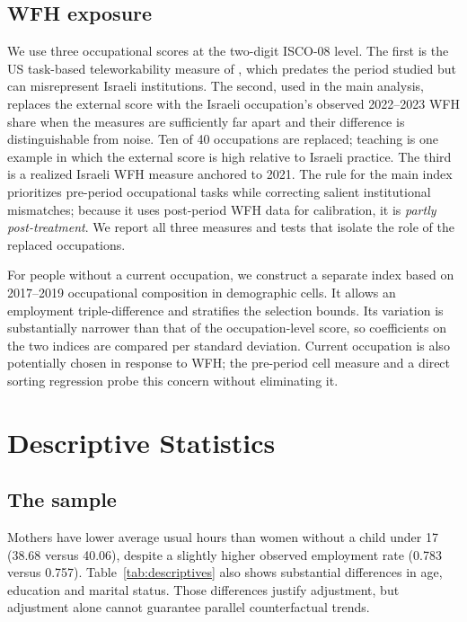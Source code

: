 \documentclass[12pt,a4paper]{article}
\begin{document}
\subsection{WFH exposure}\label{sec:exposure}
We use three occupational scores at the two-digit ISCO-08 level. The first is the US task-based teleworkability measure of \citet{dingel2020}, which predates the period studied but can misrepresent Israeli institutions. The second, used in the main analysis, replaces the external score with the Israeli occupation's observed 2022--2023 WFH share when the measures are sufficiently far apart and their difference is distinguishable from noise. Ten of 40 occupations are replaced; teaching is one example in which the external score is high relative to Israeli practice. The third is a realized Israeli WFH measure anchored to 2021. The rule for the main index prioritizes pre-period occupational tasks while correcting salient institutional mismatches; because it uses post-period WFH data for calibration, it is \emph{partly post-treatment}. We report all three measures and tests that isolate the role of the replaced occupations.

For people without a current occupation, we construct a separate index based on 2017--2019 occupational composition in demographic cells. It allows an employment triple-difference and stratifies the selection bounds. Its variation is substantially narrower than that of the occupation-level score, so coefficients on the two indices are compared per standard deviation. Current occupation is also potentially chosen in response to WFH; the pre-period cell measure and a direct sorting regression probe this concern without eliminating it.

\section{Descriptive Statistics}\label{sec:descriptives}
\subsection{The sample}
Mothers have lower average usual hours than women without a child under 17 (38.68 versus 40.06), despite a slightly higher observed employment rate (0.783 versus 0.757). Table~\ref{tab:descriptives} also shows substantial differences in age, education and marital status. Those differences justify adjustment, but adjustment alone cannot guarantee parallel counterfactual trends.
\end{document}
